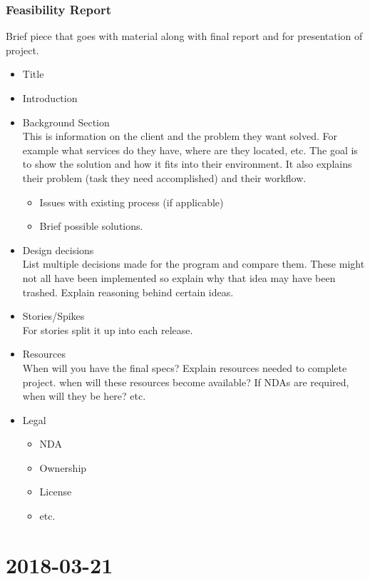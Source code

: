 \documentclass{report}
\newcommand{\mychapter}[2]{
	\setcounter{chapter}{#1}
	\setcounter{section}{0}
	\chapter*{#2}
	\addcontentsline{toc}{chapter}{#2}
}
\begin{document}
\subsection{Feasibility Report}
	Brief piece that goes with material along with final report and for presentation of project.
\begin{itemize}
\item Title
\item Introduction
\item Background Section\\
	This is information on the client and the problem they want solved. For example what services do they have, where are they located, etc. The goal is to show the solution and how it fits into their environment. It also explains their problem (task they need accomplished) and their workflow.
	\begin{itemize}
	\item Issues with existing process (if applicable)
	\item Brief possible solutions.
	\end{itemize}
\item Design decisions\\
	List multiple decisions made for the program and compare them. These might not all have been implemented so explain why that idea may have been trashed. Explain reasoning behind certain ideas.
\item Stories/Spikes\\
	For stories split it up into each release.
\item Resources\\
	When will you have the final specs? Explain resources needed to complete project. when will these resources become available? If NDAs are required, when will they be here? etc.
\item Legal
	\begin{itemize}
	\item NDA
	\item Ownership
	\item License
	\item etc.
	\end{itemize}
\end{itemize}
	
	
	
	
\mychapter{3}{2018-03-21}
\end{document}
